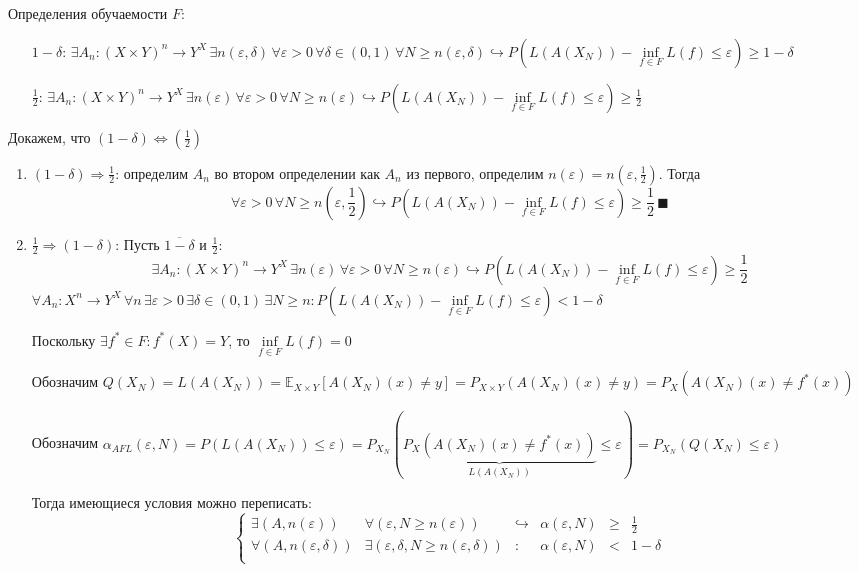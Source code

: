 \documentclass[a4paper]{article}
\def\eps{\varepsilon}
\begin{document}
Определения обучаемости $F$:
\begin{enumerate}
\item[$1-\delta$:] $\exists A_n\colon (X\times Y)^n\to Y^X\,\exists n(\eps,\delta)\,\forall \eps >0\,\forall\delta\in (0,1) \,\forall N\geqslant n(\eps,\delta)\hookrightarrow P(L(A(X_N))-\inf\limits_{f\in F}L(f)\leqslant \eps)\geqslant 1-\delta$
\item[$\frac{1}{2}$:] $\exists A_n\colon (X\times Y)^n\to Y^X\,\exists n(\eps)\,\forall \eps >0\,\forall N\geqslant n(\eps)\hookrightarrow P(L(A(X_N))-\inf\limits_{f\in F}L(f)\leqslant \eps)\geqslant \frac{1}{2}$
\end{enumerate}
Докажем, что $(1-\delta)\Leftrightarrow(\frac{1}{2})$
\begin{enumerate}
\item $(1-\delta)\Rightarrow \frac{1}{2}$: определим $A_n$ во втором определении как $A_n$ из первого, определим $n(\eps)=n(\eps,\frac{1}{2})$. Тогда $$\forall\eps>0\,\forall N\geqslant n(\eps,\frac{1}{2})\hookrightarrow P(L(A(X_N))-\inf\limits_{f\in F}L(f)\leqslant \eps)\geqslant \frac{1}{2}\,\blacksquare$$
\item $\frac{1}{2}\Rightarrow(1-\delta)$: Пусть $\overline{1-\delta}$ и $\frac{1}{2}$:
$$\exists A_n\colon (X\times Y)^n\to Y^X\,\exists n(\eps)\,\forall \eps >0\,\forall N\geqslant n(\eps)\hookrightarrow P(L(A(X_N))-\inf\limits_{f\in F}L(f)\leqslant \eps)\geqslant \frac{1}{2}$$
$\forall A_n\colon X^n\to Y^X\,\forall n\,\exists \eps >0\,\exists\delta\in (0,1) \,\exists N\geqslant n: P(L(A(X_N))-\inf\limits_{f\in F}L(f)\leqslant \eps)< 1-\delta$

Поскольку $\exists f^*\in F\colon f^*(X)=Y$, то $\inf\limits_{f\in F}L(f)=0$

Обозначим $Q(X_N)=L(A(X_N))=\mathbb{E}_{X\times Y}[A(X_N)(x)\neq y]=P_{X\times Y}(A(X_N)(x)\neq y)=P_X(A(X_N)(x)\neq f^*(x))$

Обозначим $\alpha_{AFL}(\eps, N)=P\left(L(A(X_N))\leqslant\eps\right)=P_{X_N}(\underbrace{P_X(A(X_N)(x)\neq f^*(x))}_{L(A(X_N))}\leqslant\eps)=P_{X_N}(Q(X_N)\leqslant\eps)$

Тогда имеющиеся условия можно переписать:
$$\left\{\begin{array}{llllll}
\exists (A,n(\eps)) & \forall(\eps,N\geqslant n(\eps))        & \hookrightarrow & \alpha(\eps, N)  &\geqslant & \frac{1}{2}\\
\forall (A,n(\eps,\delta)) & \exists (\eps,\delta,N\geqslant n(\eps,\delta)) & \colon          & \alpha(\eps, N)  &<          & 1-\delta\\
\end{array}\right.$$


\end{enumerate}
\end{document}
